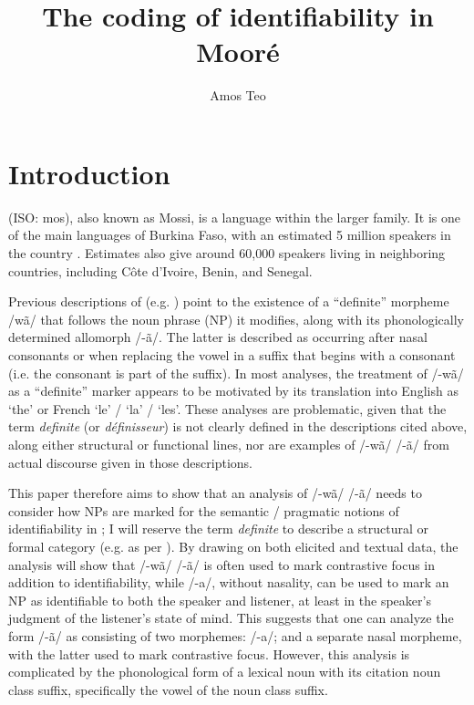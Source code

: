 \documentclass[output=paper]{langsci/langscibook}
\title{The coding of identifiability in Mooré}
\author{Amos Teo \affiliation{University of Oregon}
}
\begin{document}


\section{Introduction}\label{sec:teo:1}

 (ISO: mos), also known as Mossi, is a  language within the larger  family. It is one of the main languages of Burkina Faso, with an estimated 5 million speakers in the country \citep{Lewis2013}. Estimates also give around 60,000 speakers living in neighboring countries, including Côte d’Ivoire, Benin,  and Senegal.

Previous descriptions of  (e.g. \citealt{Peterson1971,canu1974,Canu1976,Nikiema1989}) point to the existence of a “definite” morpheme /wã/ that follows the noun phrase (NP) it modifies, along with its phonologically determined allomorph \mbox{/-ã/}. The latter is described as occurring after nasal consonants or when replacing the vowel in a suffix that begins with a consonant (i.e. the consonant is part of the suffix). In most analyses, the treatment of /-wã/ as a “definite” marker appears to be motivated by its translation into English as ‘the’ or French ‘le’ / ‘la’ / ‘les’. These analyses are problematic, given that the term \textit{definite} (or \textit{définisseur}) is not clearly defined in the descriptions cited above, along either structural or functional lines, nor are examples of /-wã/ {\Tilde} /-ã/ from actual discourse given in those descriptions.

This paper therefore aims to show that an analysis of /-wã/ {\Tilde} /-ã/ needs to consider how NPs are marked for the semantic / pragmatic notions of identifiability in ; I will reserve the term \textit{definite} to describe a structural or formal category (e.g. as per \citealt{DuBois1980}). By drawing on both elicited and textual data, the analysis will show that /-wã/ {\Tilde} /-ã/ is often used to mark contrastive focus in addition to identifiability, while /-a/, without nasality, can be used to mark an NP as identifiable to both the speaker and listener, at least in the speaker’s judgment of the listener’s state of mind. This suggests that one can analyze the form /-ã/ as consisting of two morphemes: /-a/; and a separate nasal morpheme, with the latter used to mark contrastive focus. However, this analysis is complicated by the phonological form of a lexical noun with its citation noun class suffix, specifically the vowel of the noun class suffix.
\end{document}
